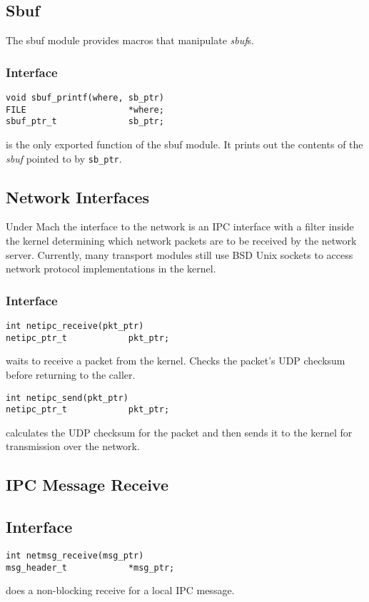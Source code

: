 \subsection{Sbuf}
The sbuf module provides macros that manipulate {\it sbuf\/}s.

\subsubsection{Interface}
\begin{verbatim}
void sbuf_printf(where, sb_ptr)
FILE                    *where;
sbuf_ptr_t              sb_ptr;
\end{verbatim}
is the only exported function of the sbuf module.  It prints out the
contents of the {\it sbuf} pointed to by \verb"sb_ptr".

\subsection{Network Interfaces}
Under Mach the interface to the network is an IPC interface with a
filter inside the kernel determining which network packets are to be
received by the network server.  Currently, many transport modules
still use BSD Unix sockets to access network protocol implementations
in the kernel.

\subsubsection{Interface}
\begin{verbatim}
int netipc_receive(pkt_ptr)
netipc_ptr_t            pkt_ptr;
\end{verbatim}
waits to receive a packet from the kernel.  Checks the packet's UDP checksum
before returning to the caller.

\begin{verbatim}
int netipc_send(pkt_ptr)
netipc_ptr_t            pkt_ptr;
\end{verbatim}
calculates the UDP checksum for the packet and then sends it to the kernel
for transmission over the network.

\subsection{IPC Message Receive}
\subsection{Interface}
\begin{verbatim}
int netmsg_receive(msg_ptr)
msg_header_t            *msg_ptr;
\end{verbatim}
does a non-blocking receive for a local IPC message.

